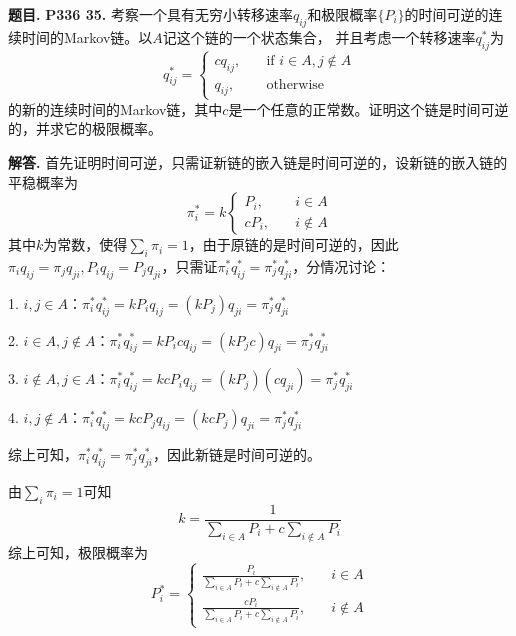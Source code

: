 \documentclass[12pt, a4paper, oneside]{ctexart}
\newcounter{problem}  %
\newenvironment{problem}[1][]{\stepcounter{problem}\par\noindent\textbf{题目\arabic{problem}. #1}}{\smallskip\par}
\newenvironment{solution}[1][]{\par\noindent\textbf{#1解答. }}{\smallskip\par}  %
\begin{document}
\begin{problem}
    \textbf{P336 35.}
    考察一个具有无穷小转移速率$q_{ij}$和极限概率$\{P_i\}$的时间可逆的连续时间的Markov链。以$A$记这个链的一个状态集合，
    并且考虑一个转移速率$q^*_{ij}$为
    \begin{equation*}
        q^*_{ij} = \begin{cases}
            cq_{ij},&\quad \text{if }i\in A, j\notin A \\
            q_{ij},&\quad \text{otherwise}
        \end{cases}
    \end{equation*}
    的新的连续时间的Markov链，其中$c$是一个任意的正常数。证明这个链是时间可逆的，并求它的极限概率。
\end{problem}
\begin{solution}
    首先证明时间可逆，只需证新链的嵌入链是时间可逆的，设新链的嵌入链的平稳概率为
    \begin{equation*}
        \pi_{i}^* = k\begin{cases}
            P_i,&\quad i\in A\\
            cP_i,&\quad i\notin A
        \end{cases}
    \end{equation*}
    其中$k$为常数，使得$\sum_i\pi_i = 1$，由于原链的是时间可逆的，因此$\pi_iq_{ij} = \pi_jq_{ji}, P_iq_{ij} = P_jq_{ji}$，只需证$\pi^*_iq^*_{ij}=\pi^*_jq^*_{ji}$，分情况讨论：

    1. $i,j \in A$：$\pi_i^*q_{ij}^* = kP_iq_{ij} = (kP_j)q_{ji} = \pi_j^*q^*_{ji}$

    2. $i\in A, j\notin A$：$\pi_i^*q_{ij}^*=kP_icq_{ij}=(kP_jc)q_{ji}=\pi_j^*q_{ji}^*$

    3. $i\notin A, j\in A$：$\pi_i^*q_{ij}^* = kcP_iq_{ij}=(kP_j)(cq_{ji})=\pi_j^*q_{ji}^*$

    4. $i, j \notin A$：$\pi_i^*q_{ij}^* = kcP_jq_{ij}=(kcP_j)q_{ji} = \pi_j^*q_{ji}^*$

    综上可知，$\pi_i^*q_{ij}^*=\pi_j^*q_{ji}^*$，因此新链是时间可逆的。

    由$\sum_i\pi_i = 1$可知
    \begin{equation*}
        k = \frac{1}{\sum_{i\in A}P_i+c\sum_{i\notin A}P_i}
    \end{equation*}
    综上可知，极限概率为
    \begin{equation*}
        P_{i}^* = \begin{cases}
            \frac{P_i}{\sum_{i\in A}P_i+c\sum_{i\notin A}P_i},&\quad i\in A\\
            \frac{cP_i}{\sum_{i\in A}P_i+c\sum_{i\notin A}P_i},&\quad i\notin A
        \end{cases}
    \end{equation*}
\end{solution}
\end{document}

